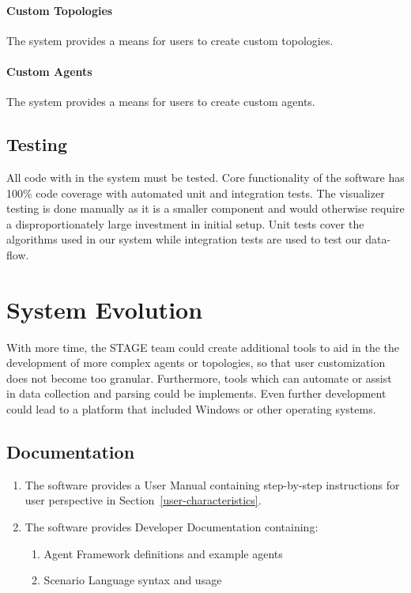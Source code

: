 \documentclass[titlepage]{article}
\begin{document}
    \paragraph{Custom Topologies} The system provides a means for users to create custom topologies.
    \paragraph{Custom Agents} The system provides a means for users to create custom agents.

\subsection{Testing%
    \label{testing}%
}
All code with in the system must be tested. Core functionality of the software has 100\% code coverage with automated unit and integration tests.  The visualizer testing is done manually as it is a smaller component and would otherwise require a disproportionately large investment in initial setup.  Unit tests cover the algorithms used in our system while integration tests are used to test our data-flow.  

\section{System Evolution}

With more time, the STAGE team could create additional tools to aid in the the development of more complex agents or topologies, so that user customization does not become too granular.  Furthermore, tools which can automate or assist in data collection and parsing could be implements.  Even further development could lead to a platform that included Windows or other operating systems.


\subsection{Documentation%
  \label{documentation}%
}
\begin{enumerate}
    \item The software provides a User Manual containing step-by-step instructions for user perspective in Section~\ref{user-characteristics}.
    \item The software provides Developer Documentation containing:
    \begin{enumerate}
        \item Agent Framework definitions and example agents
        \item Scenario Language syntax and usage
    \end{enumerate}
\end{enumerate}


\appendix
\pagebreak
\end{document}
